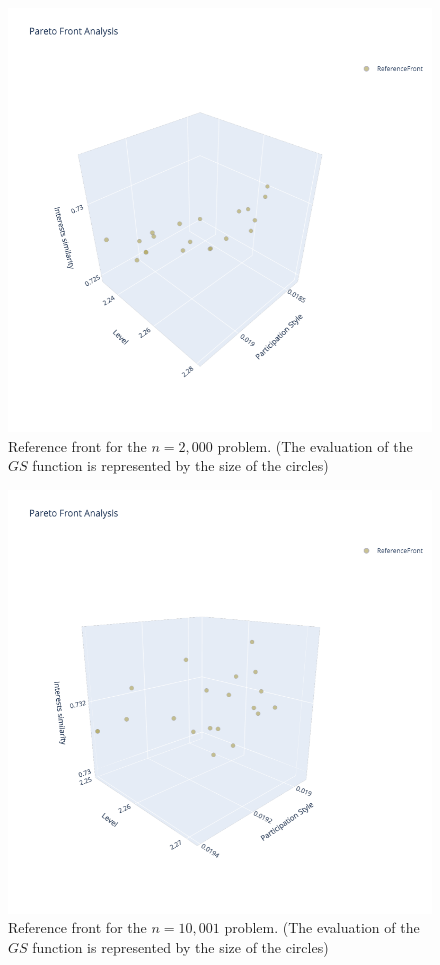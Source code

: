 \begin{figure}
    \centering
    \includegraphics[width=\textwidth]{images/reference_front_2000.png}
    \caption{Reference front for the $n=2,000$ problem. (The evaluation of the $GS$ function is represented by the size of the circles)}
    \label{fig:reference_front_2000}
\end{figure}

\begin{figure}
    \centering
    \includegraphics[width=\textwidth]{images/reference_front_10001.png}
    \caption{Reference front for the $n=10,001$ problem. (The evaluation of the $GS$ function is represented by the size of the circles)}
    \label{fig:reference_front_10001}
\end{figure}

